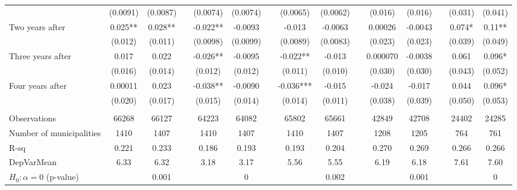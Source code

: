 \begin{tabular}{lcccccccccccccc}
      & (0.0091) & (0.0087) &       & (0.0074) & (0.0074) &       & (0.0065) & (0.0062) &       & (0.016) & (0.016) &       & (0.031) & (0.041) \\
Two years after & 0.025** & 0.028** &       & -0.022** & -0.0093 &       & -0.013 & -0.0063 &       & 0.00026 & -0.0043 &       & 0.074* & 0.11** \\
      & (0.012) & (0.011) &       & (0.0098) & (0.0099) &       & (0.0089) & (0.0083) &       & (0.023) & (0.023) &       & (0.039) & (0.049) \\
Three years after & 0.017 & 0.022 &       & -0.026** & -0.0095 &       & -0.022** & -0.013 &       & 0.000070 & -0.0038 &       & 0.061 & 0.096* \\
      & (0.016) & (0.014) &       & (0.012) & (0.012) &       & (0.011) & (0.010) &       & (0.030) & (0.030) &       & (0.043) & (0.052) \\
Four years after & 0.00011 & 0.023 &       & -0.038** & -0.0090 &       & -0.036*** & -0.015 &       & -0.024 & -0.017 &       & 0.044 & 0.096* \\
      & (0.020) & (0.017) &       & (0.015) & (0.014) &       & (0.014) & (0.011) &       & (0.038) & (0.039) &       & (0.050) & (0.053) \\
      &       &       &       &       &       &       &       &       &       &       &       &       &       &  \\
\midrule
Observations & 66268 & 66127 &       & 64223 & 64082 &       & 65802 & 65661 &       & 42849 & 42708 &       & 24402 & 24285 \\
Number of municipalities & 1410  & 1407  &       & 1410  & 1407  &       & 1410  & 1407  &       & 1208  & 1205  &       & 764   & 761 \\
R-sq  & 0.221 & 0.233 &       & 0.186 & 0.193 &       & 0.193 & 0.204 &       & 0.270 & 0.269 &       & 0.266 & 0.266 \\
DepVarMean & 6.33  & 6.32  &       & 3.18  & 3.17  &       & 5.56  & 5.55  &       & 6.19  & 6.18  &       & 7.61  & 7.60 \\
$H_0 : \alpha = 0$ (p-value) &       & 0.001 &       &       & 0     &       &       & 0.002 &       &       & 0.001 &       &       & 0 \\
\bottomrule
\bottomrule
\end{tabular}%
